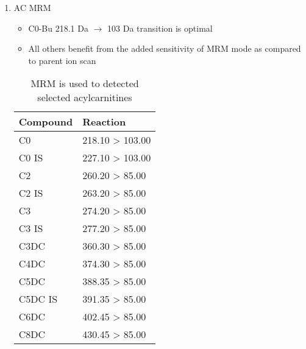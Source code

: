 \documentclass{scrartcl}
\begin{document}
\begin{enumerate}
\begin{LaTeX}
\begin{center}
\end{center}
\end{LaTeX}

\item AC MRM
\label{sec:org1a3fd1a}

\begin{itemize}
\item C0-Bu 218.1 Da \(\to\) 103 Da transition is optimal
\item All others benefit from the added sensitivity of MRM mode as compared to parent ion scan
\end{itemize}

\begin{table}[htbp]
\caption{\label{tab:org7cbe275}
MRM is used to detected selected acylcarnitines}
\centering
\begin{tabular}{ll}
Compound & Reaction\\
\hline
C0 & 218.10 > 103.00\\
C0 IS & 227.10 > 103.00\\
C2 & 260.20 > 85.00\\
C2 IS & 263.20 > 85.00\\
C3 & 274.20 > 85.00\\
C3 IS & 277.20 > 85.00\\
C3DC & 360.30 > 85.00\\
C4DC & 374.30 > 85.00\\
C5DC & 388.35 > 85.00\\
C5DC IS & 391.35 > 85.00\\
C6DC & 402.45 > 85.00\\
C8DC & 430.45 > 85.00\\
\end{tabular}
\end{table}


\end{enumerate}
\end{document}
